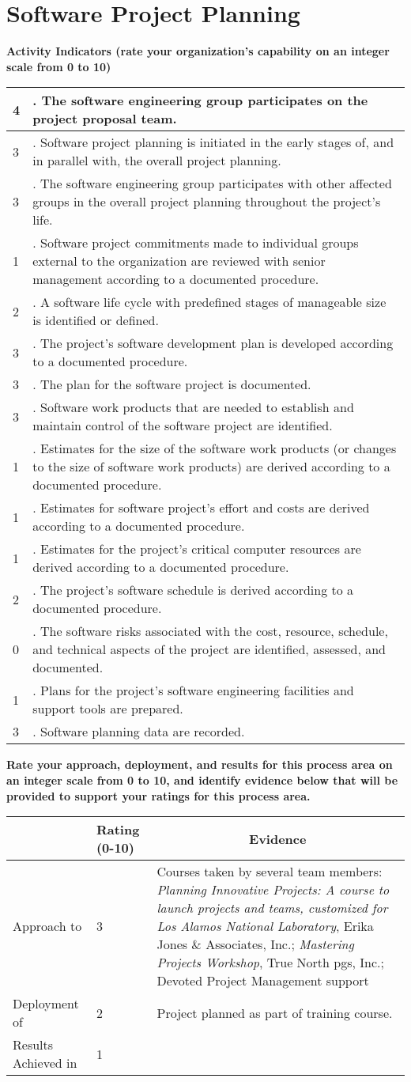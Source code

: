 \documentclass{article}
\newcommand{\KPAname}{}
\newenvironment{KPARate}[1]
	{\renewcommand{\KPAname}{#1}
	 {\bf Rate your approach, deployment, and results for
	  this process area on an integer scale from 0 to 10, and 
	  identify evidence below that will be provided to support your
	  ratings for this process area.}
	 \begin{center}
	 \begin{tabular}{|p{1.0in}|p{0.5in}|p{5.0in}|} \hline
	 & Rating (0-10) & \multicolumn{1}{c|}{Evidence} \\ \hline}
	{\end{tabular}
	 \end{center}}
\newcommand{\Approach}[2]{Approach to \KPAname & #1 & #2 \\ \hline}
\newcommand{\Deployment}[2]{Deployment of \KPAname & #1 & #2 \\ \hline}
\newcommand{\Results}[2]{Results Achieved in \KPAname & #1 & #2 \\
	\hline}
\newcounter{activity}
\newenvironment{KPAActivity}
	{
	 \setcounter{activity}{0}
	 {\bf Activity Indicators (rate your organization's capability
	 on an integer scale from 0 to 10)}
	 \begin{center}
	 \begin{tabular}{|p{0.5in}|p{6.0in}|} \hline
	}
	{
	 \end{tabular}
	 \end{center}
	}
\newcommand{\Activity}[2]{\stepcounter{activity} #1 &
\arabic{activity}. #2 \\ \hline}
\begin{document}
\newpage
\section{Software Project Planning}

\begin{KPAActivity}
\Activity{4}{The software engineering group participates on the
project proposal team.}
\Activity{3}{Software project planning is initiated in the early
stages of, and in parallel with, the overall project planning.}
\Activity{3}{The software engineering group participates with other
affected groups in the overall project planning throughout the
project's life.}
\Activity{1}{Software project commitments made to individual groups
external to the organization are reviewed with senior management
according to a documented procedure.}
\Activity{2}{A software life cycle with predefined stages of
manageable size is identified or defined.}
\Activity{3}{The project's software development plan is developed
according to a documented procedure.}
\Activity{3}{The plan for the software project is documented.}
\Activity{3}{Software work products that are needed to establish
and maintain control of the software project are identified.}
\Activity{1}{Estimates for the size of the software work products (or
changes to the size of software work products) are derived according
to a documented procedure.}
\Activity{1}{Estimates for software project's effort and costs are
derived according to a documented procedure.}
\Activity{1}{Estimates for the project's critical computer
resources are derived according to a documented procedure.}
\Activity{2}{The project's software schedule is derived according
to a documented procedure.}
\Activity{0}{The software risks associated with the cost,
resource, schedule, and technical aspects of the project are
identified, assessed, and documented.}
\Activity{1}{Plans for the project's software engineering
facilities and support tools are prepared.}
\Activity{3}{Software planning data are recorded.}
\end{KPAActivity}

\begin{KPARate}{Software Project Planning}
\Approach{3}{Courses taken by several team members: 
             {\em Planning Innovative Projects: A course to launch
             projects and teams, customized for Los Alamos National
             Laboratory}, Erika Jones \& Associates, Inc.; 
             {\em Mastering Projects Workshop}, True North pgs, Inc.;
             Devoted Project Management support}
\Deployment{2}{Project planned as part of training course.}
\Results{1}{}
\end{KPARate}
\end{document}
